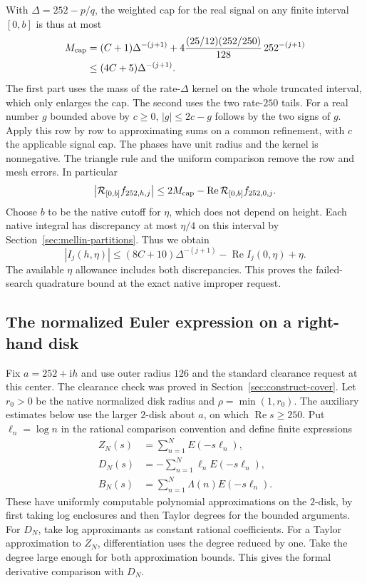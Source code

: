 \documentclass[11pt]{amsart}
\theoremstyle{definition}
\theoremstyle{remark}
\numberwithin{equation}{section}
\newcommand{\re}{\operatorname{Re}}
\begin{document}
With \(\Delta=252-p/q\), the weighted cap for the real
signal on any finite interval \([0,b]\) is thus at most
\begin{align*}
 M_{\rm cap}
   &=(C+1)\Delta^{-(j+1)}
             +4\frac{(25/12)(252/250)}{128}\,252^{-(j+1)}\\
   &\le (4C+5)\Delta^{-(j+1)} .
\end{align*}
The first part uses the mass of the rate-\(\Delta\) kernel on
the whole truncated interval, which only enlarges the cap.
The second uses the two rate-\(250\) tails.
For a real number \(g\) bounded above by \(c\ge0\),
\(|g|\le 2c-g\) follows by the two signs of \(g\).
Apply this row by row to approximating sums on a common
refinement, with \(c\) the applicable signal cap.
The phases have unit radius and the kernel is nonnegative.
The triangle rule and the uniform comparison remove the row
and mesh errors. In particular
\[
  \left|\mathcal R_{[0,b]} f_{252,h,j}\right|
      \le 2M_{\rm cap}
                   -\re\mathcal R_{[0,b]} f_{252,0,j}.
\]
Choose \(b\) to be the native cutoff for \(\eta\), which
does not depend on height. Each native integral has discrepancy
at most \(\eta/4\) on this interval by
Section~\ref{sec:mellin-partitions}. Thus we obtain
\begin{equation}\label{eq:proved-window-quadrature}
 |I_j(h,\eta)|\le(8C+10)\Delta^{-(j+1)}-\re I_j(0,\eta)+\eta .
\end{equation}
The available \(\eta\) allowance includes both discrepancies.
This proves the failed-search quadrature bound at the exact
native improper request.

\subsection{The normalized Euler expression on a right-hand disk}
\label{sec:mellin-normalized-identity}

Fix \(a=252+\mathrm i h\) and use outer radius \(126\) and
the standard clearance request at this center. The clearance
check was proved in Section~\ref{sec:construct-cover}.
Let \(r_0>0\) be the native normalized disk radius and
\(\rho=\min(1,r_0)\).
The auxiliary estimates below use the larger \(2\)-disk
about \(a\), on which \(\re s\ge250\).
Put \(\ell_n=\log n\) in the rational comparison convention
and define finite expressions
\begin{align*}
  Z_N(s)&=\sum_{n=1}^N E(-s\ell_n),\\
  D_N(s)&=-\sum_{n=1}^N\ell_n E(-s\ell_n),\\
  B_N(s)&=\sum_{n=1}^N\Lambda(n)E(-s\ell_n).
\end{align*}
These have uniformly computable polynomial approximations
on the \(2\)-disk, by first taking log enclosures and then
Taylor degrees for the bounded arguments. For \(D_N\),
take log approximants as constant rational coefficients.
For a Taylor approximation to \(Z_N\), differentiation
uses the degree reduced by one. Take the degree large
enough for both approximation bounds. This gives the
formal derivative comparison with \(D_N\).
\end{document}
